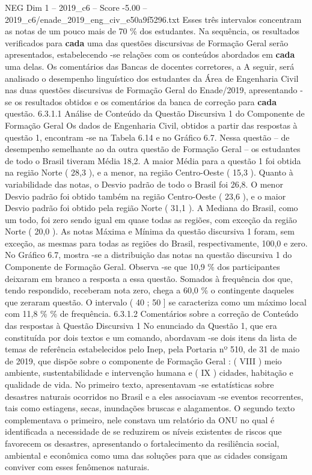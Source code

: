 \begin{textsample}{NEG Dim 1 – 2019\_c6 – Score -5.00 – 2019\_c6/enade\_2019\_eng\_civ\_e50a9f5296.txt}
Esses três intervalos concentram as notas de um pouco mais de 70 \% dos estudantes.
Na sequência, os resultados verificados para \textbf{cada} uma das questões discursivas de Formação Geral serão apresentados, estabelecendo -se relações com os conteúdos abordados em \textbf{cada} uma delas.
Os comentários das Bancas de docentes corretores, a A seguir, será analisado o desempenho linguístico dos estudantes da Área de Engenharia Civil nas duas questões discursivas de Formação Geral do Enade/2019, apresentando -se os resultados obtidos e os comentários da banca de correção para \textbf{cada} questão. 6.3.1.1 Análise de Conteúdo da Questão Discursiva 1 do Componente de Formação Geral Os dados de Engenharia Civil, obtidos a partir das respostas à questão 1, encontram -se na Tabela 6.14 e no Gráfico 6.7.
Nessa questão – de desempenho semelhante ao da outra questão de Formação Geral – os estudantes de todo o Brasil tiveram Média 18,2.
A maior Média para a questão 1 foi obtida na região Norte ( 28,3 ), e a menor, na região Centro-Oeste ( 15,3 ).
Quanto à variabilidade das notas, o Desvio padrão de todo o Brasil foi 26,8.
O menor Desvio padrão foi obtido também na região Centro-Oeste ( 23,6 ), e o maior Desvio padrão foi obtido pela região Norte ( 31,1 ).
A Mediana do Brasil, como um todo, foi zero sendo igual em quase todas as regiões, com exceção da região Norte ( 20,0 ).
As notas Máxima e Mínima da questão discursiva 1 foram, sem exceção, as mesmas para todas as regiões do Brasil, respectivamente, 100,0 e zero.
No Gráfico 6.7, mostra -se a distribuição das notas na questão discursiva 1 do Componente de Formação Geral.
Observa -se que 10,9 \% dos participantes deixaram em branco a resposta a essa questão.
Somados à frequência dos que, tendo respondido, receberam nota zero, chega a 60,0 \% o contingente daqueles que zeraram questão.
O intervalo ( 40 ; 50 ] se caracteriza como um máximo local com 11,8 \% \% de frequência. 6.3.1.2 Comentários sobre a correção de Conteúdo das respostas à Questão Discursiva 1 No enunciado da Questão 1, que era constituída por dois textos e um comando, abordavam -se dois itens da lista de temas de referência estabelecidos pelo Inep, pela Portaria nº 510, de 31 de maio de 2019, que dispõe sobre o componente de Formação Geral : ( VIII ) meio ambiente, sustentabilidade e intervenção humana e ( IX ) cidades, habitação e qualidade de vida.
No primeiro texto, apresentavam -se estatísticas sobre desastres naturais ocorridos no Brasil e a eles associavam -se eventos recorrentes, tais como estiagens, secas, inundações bruscas e alagamentos.
O segundo texto complementava o primeiro, nele constava um relatório da ONU no qual é identificada a necessidade de se reduzirem os níveis existentes de riscos que favorecem os desastres, apresentando o fortalecimento da resiliência social, ambiental e econômica como uma das soluções para que as cidades consigam conviver com esses fenômenos naturais.

\end{textsample}
